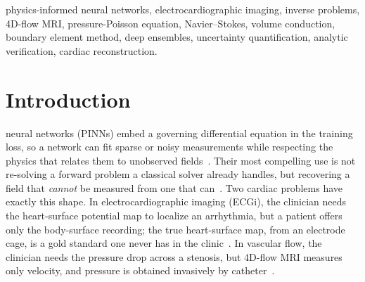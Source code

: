 \documentclass[journal]{IEEEtran}
\begin{document}
{\begin{IEEEkeywords}
physics-informed neural networks, electrocardiographic imaging, inverse problems, 4D-flow
MRI, pressure-Poisson equation, Navier--Stokes, volume conduction, boundary element method,
deep ensembles, uncertainty quantification, analytic verification, cardiac reconstruction.
\end{IEEEkeywords}}

\maketitle
\IEEEdisplaynotcompsoctitleabstractindextext
\IEEEpeerreviewmaketitle

\section{Introduction}

 neural networks (PINNs) embed a governing differential
equation in the training loss, so a network can fit sparse or noisy measurements while
respecting the physics that relates them to unobserved fields~\cite{raissi2019}. Their most
compelling use is not re-solving a forward problem a classical solver already handles, but
recovering a field that \emph{cannot} be measured from one that can~\cite{raissi2020}. Two
cardiac problems have exactly this shape. In electrocardiographic imaging (ECGi), the
clinician needs the heart-surface potential map to localize an arrhythmia, but a patient
offers only the body-surface recording; the true heart-surface map, from an electrode cage,
is a gold standard one never has in the clinic~\cite{ramanathan2004}. In vascular flow, the
clinician needs the pressure drop across a stenosis, but 4D-flow MRI measures only velocity,
and pressure is obtained invasively by catheter~\cite{krittian2012}.
\end{document}
